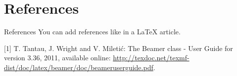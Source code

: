 \documentclass{beamer}
\begin{document}
\section{References}
\begin{frame}{References}
  You can add references like in a LaTeX article.

  \begin{thebibliography}{10}
  [1] T. Tantau, J. Wright and V. Miletić: The Beamer class -
    User Guide for version 3.36, 2011, available online:
    \url{http://texdoc.net/texmf-dist/doc/latex/beamer/doc/beameruserguide.pdf}.
  \end{thebibliography}
\end{frame}
\end{document}
